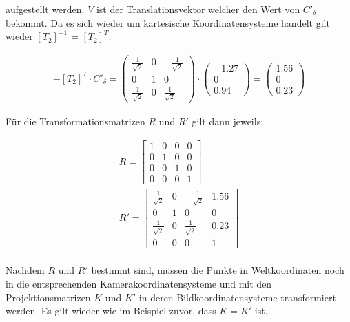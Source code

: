 aufgestellt werden. $V$ ist der Translationsvektor welcher den Wert von $C'_\delta$ bekommt. Da es sich wieder um kartesische Koordinatensysteme handelt gilt wieder $[T_2]^{-1}$ = $[T_2]^{T}$.

\begin{gather}
	-[T_2]^{T}\cdot C'_\delta = 
	\begin{pmatrix}
		\frac{1}{\sqrt{2}}&0&-\frac{1}{\sqrt{2}}\\
		0&1&0\\
		\frac{1}{\sqrt{2}}&0&\frac{1}{\sqrt{2}}
	\end{pmatrix}
	\cdot
	\begin{pmatrix}
		-1.27\\0\\0.94
	\end{pmatrix}
	=
	\begin{pmatrix}
		1.56\\0\\0.23
	\end{pmatrix}
\end{gather}

Für die Transformationsmatrizen $R$ und $R'$ gilt dann jeweils:

\begin{gather}
	R = 
	\begin{bmatrix}
		1&0&0&0\\
		0&1&0&0\\
		0&0&1&0\\
		0&0&0&1
	\end{bmatrix}\\	
	R'=
	\begin{bmatrix}
		\frac{1}{\sqrt{2}}&0&-\frac{1}{\sqrt{2}}&1.56\\
		0&1&0&0\\
		\frac{1}{\sqrt{2}}&0&\frac{1}{\sqrt{2}}&0.23\\
		0&0&0&1
	\end{bmatrix}
\end{gather}\\

Nachdem $R$ und $R'$ bestimmt sind,  müssen die Punkte in Weltkoordinaten noch in die entsprechenden Kamerakoordinatensysteme und mit den Projektionsmatrizen $K$ und $K'$ in deren Bildkoordinatensysteme transformiert werden. Es gilt wieder wie im Beispiel zuvor, dass $K = K'$ ist.

